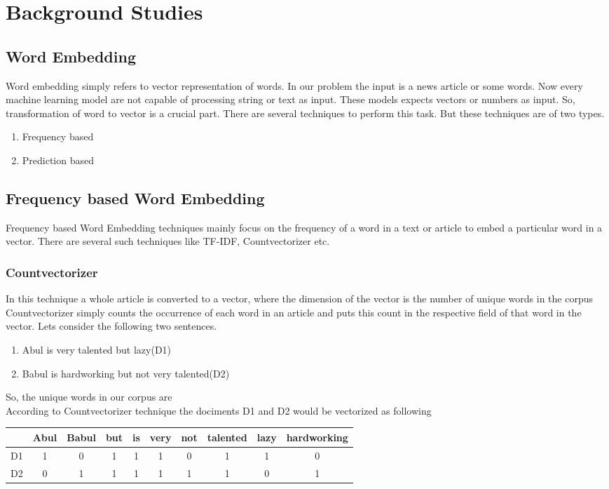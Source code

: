 \documentclass[12pt]{article}
\begin{document}
\section{Background Studies}
\subsection{Word Embedding}
Word embedding simply refers to vector representation of words. In our problem the input is a news article or some words. Now every machine learning model are not capable of processing string or text as input. These models expects vectors or numbers as input. So, transformation of word to vector is a crucial part.
There are several techniques to perform this task. But these techniques are of two types.\\
\begin{enumerate}
\item Frequency based
\item Prediction based
\end{enumerate}
\subsection{Frequency based Word Embedding}
Frequency based Word Embedding techniques mainly focus on the frequency of a word in a text or article to embed a particular word in a vector. There are several such techniques like TF-IDF, Countvectorizer etc.

\subsubsection{Countvectorizer}
In this technique a whole article is converted to a vector, where the dimension of the vector is the number of unique words in the corpus Countvectorizer simply counts the occurrence of each word in an article and puts this count in the respective field of that word in the vector. Lets consider the following two sentences. 
\begin{enumerate}
\item Abul is very talented but lazy(D1)
\item Babul is hardworking but not very talented(D2)
\end{enumerate}
So, the unique words in our corpus are\\ 
According to Countvectorizer technique the dociments D1 and D2 would be vectorized as following
\begin{center}
  \begin{tabular}{ | c | c | c | c | c | c | c | c | c | c |}
    \hline
      & Abul & Babul & but & is & very & not & talented & lazy & hardworking \\ \hline
    D1 & 1 & 0 & 1 & 1 & 1 & 0 & 1 & 1 & 0 \\ \hline
    D2 & 0 & 1 & 1 & 1 & 1 & 1 & 1 & 0 & 1 \\
    \hline
  \end{tabular}
\end{center}
\end{document}

